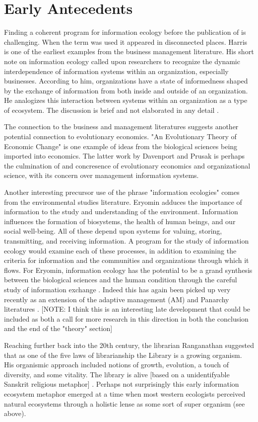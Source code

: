 \section{Early Antecedents}

Finding a coherent program for information ecology before the publication of \cite{nardi_information_1999, davenport_information_1997} is challenging. When the term was used it appeared in disconnected places. Harris is one of the earliest examples from the business management literature. His short note on information ecology called upon researchers to recognize the dynamic interdependence of information systems within an organization, especially businesses. According to him, organizations have a state of informedness shaped by the exchange of information from both inside and outside of an organization. He analogizes this interaction between systems within an organization as a type of ecosystem. The discussion is brief and not elaborated in any detail \cite{harris_information_1989}.

The connection to the business and management literatures suggests another potential connection to evolutionary economics. "An Evolutionary Theory of Economic Change" \cite{nelson_evolutionary_1985} is one example of ideas from the biological sciences being imported into economics. The latter work by Davenport and Prusak is perhaps the culmination of and concresence of evolutionary economics and organizational science, with its concern over management information systems.

Another interesting precursor use of the phrase "information ecologies" comes from the environmental studies literature. Eryomin adduces the importance of information to the study and understanding of the environment. Information influences the formation of biosystems, the health of human beings, and our social well-being. All of these depend upon systems for valuing, storing, transmitting, and receiving information. A program for the study of information ecology would examine each of these processes, in addition to examining the criteria for information and the communities and organizations through which it flows. For Eryomin, information ecology has the potential to be a grand synthesis between the biological sciences and the human condition through the careful study of information exchange \cite{eryomin_information_1998}. Indeed this has again been picked up very recently as an extension of the adaptive management (AM) and Panarchy literatures \cite{eddy_information_2014}. [NOTE: I think this is an interesting late development that could be included as both a call for more research in this direction in both the conclusion and the end of the "theory" section]

Reaching further back into the 20th century, the librarian Ranganathan suggested that as one of the five laws of librarianship the Library is a growing organism. His organismic approach included notions of growth, evolution, a touch of diversity, and some vitality. The library is alive [based on a unidentifyable Sanskrit religious metaphor] \cite{ranganathan_1931}. Perhaps not surprisingly this early information ecosystem metaphor emerged at a time when most western ecologists perceived natural ecosystems through a holistic lense as some sort of super organism (see above).
